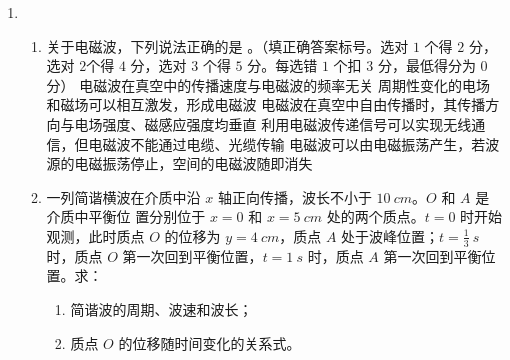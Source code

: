 \begin{enumerate}
\begin{enumerate}

	
\end{enumerate}



\item 
{}
 \begin{enumerate}
 	\item
关于电磁波，下列说法正确的是 \underlinegap 。（填正确答案标号。选对 $ 1 $ 个得 $ 2 $ 分，选对
$ 2 $个得 $ 4 $ 分，选对 $ 3 $ 个得 $ 5 $ 分。每选错 $ 1 $ 个扣 $ 3 $ 分，最低得分为 $ 0 $ 分）
\fivechoices
{电磁波在真空中的传播速度与电磁波的频率无关}
{周期性变化的电场和磁场可以相互激发，形成电磁波}
{电磁波在真空中自由传播时，其传播方向与电场强度、磁感应强度均垂直}
{利用电磁波传递信号可以实现无线通信，但电磁波不能通过电缆、光缆传输}
{电磁波可以由电磁振荡产生，若波源的电磁振荡停止，空间的电磁波随即消失}



\item 
一列简谐横波在介质中沿 $ x $ 轴正向传播，波长不小于 $ 10 \ cm $。$ O $ 和 $ A $ 是介质中平衡位
置分别位于 $ x=0 $ 和 $ x=5 \ cm $ 处的两个质点。$ t=0 $ 时开始观测，此时质点 $ O $ 的位移为 $ y=4 \ cm $，质点 $ A $
处于波峰位置；$ t=  \frac{ 1 }{ 3 } \ s $ 时，质点 $ O $ 第一次回到平衡位置，$ t=1 \ s $ 时，质点 $ A $ 第一次回到平衡位置。求：
\begin{enumerate}
	\item
简谐波的周期、波速和波长；
\item 
质点 $ O $ 的位移随时间变化的关系式。
\end{enumerate}


\end{enumerate}
\end{enumerate}
